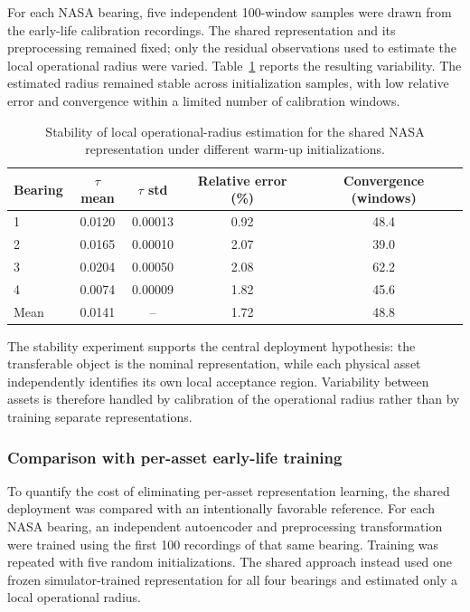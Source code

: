\documentclass[11pt,a4paper]{article}
\begin{document}
For each NASA bearing, five independent 100-window samples were drawn from
the early-life calibration recordings. The shared representation and its
preprocessing remained fixed; only the residual observations used to
estimate the local operational radius were varied.
Table~\ref{tab:nasa-stability} reports the resulting variability. The
estimated radius remained stable across initialization samples, with low
relative error and convergence within a limited number of calibration
windows.

\begin{table}[H]
\centering
\caption{Stability of local operational-radius estimation for the shared
NASA representation under different warm-up initializations.}
\label{tab:nasa-stability}

\begin{tabular}{lcccc}
\toprule
Bearing &
$\tau$ mean &
$\tau$ std &
Relative error (\%) &
Convergence (windows)
\\
\midrule

1 & 0.0120 & 0.00013 & 0.92 & 48.4\\
2 & 0.0165 & 0.00010 & 2.07 & 39.0\\
3 & 0.0204 & 0.00050 & 2.08 & 62.2\\
4 & 0.0074 & 0.00009 & 1.82 & 45.6\\

\midrule
Mean &
0.0141 &
--
&
1.72 &
48.8
\\

\bottomrule
\end{tabular}
\end{table}


The stability experiment supports the central deployment hypothesis:
the transferable object is the nominal representation, while each physical
asset independently identifies its own local acceptance region. Variability
between assets is therefore handled by calibration of the operational
radius rather than by training separate representations.

\subsubsection{Comparison with per-asset early-life training}

To quantify the cost of eliminating per-asset representation learning, the
shared deployment was compared with an intentionally favorable reference.
For each NASA bearing, an independent autoencoder and preprocessing
transformation were trained using the first 100 recordings of that same
bearing. Training was repeated with five random initializations. The shared
approach instead used one frozen simulator-trained representation for all
four bearings and estimated only a local operational radius.
\end{document}
